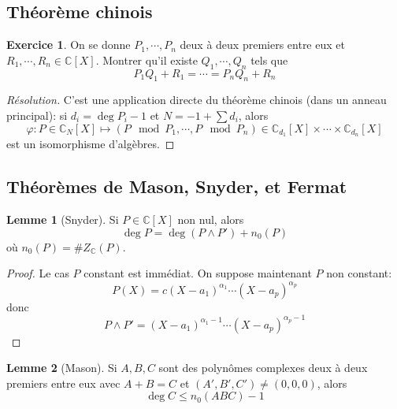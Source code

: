 \documentclass{article}
\theoremstyle{definition}
\newtheorem*{lmm}{Lemme}
\newtheorem*{exo}{Exercice}
\begin{document}
\subsection{Théorème chinois}

\begin{exo}
On se donne $P_1, \cdots, P_n$ deux à deux premiers entre eux et $R_1, \cdots, R_n\in\mathbb C[X]$. Montrer qu'il existe $Q_1, \cdots, Q_n$ tels que \[
    P_1Q_1+R_1=\cdots=P_nQ_n+R_n
\]
\end{exo}

\begin{proof}[Résolution]
    C'est une application directe du théorème chinois (dans un anneau principal): si $d_i=\deg P_i-1$ et $N=-1+\sum d_i$, alors \[
        \varphi: P\in \mathbb C_N[X]\longmapsto (P\mod P_1, \cdots, P\mod P_n)\in\mathbb C_{d_1}[X]\times \cdots \times \mathbb C_{d_n}[X]
    \]
    est un isomorphisme d'algèbres.
\end{proof}

\subsection{Théorèmes de Mason, Snyder, et Fermat}
\begin{lmm}[Snyder]
    Si $P\in\mathbb C[X]$ non nul, alors \[
        \deg P=\deg \left(P\land P'\right)+n_0(P)
    \]
    où $n_0(P)=\#Z_{\mathbb C}(P)$.
\end{lmm}

\begin{proof}
    Le cas $P$ constant est immédiat. On suppose maintenant $P$ non constant: \[
        P(X)=c(X-a_1)^{\alpha_1}\cdots (X-a_p)^{\alpha_p}
    \]
    donc \[
        P\land P'=(X-a_1)^{\alpha_1-1}\cdots (X-a_p)^{\alpha_p-1}
    \]
\end{proof}

\begin{lmm}[Mason]
    Si $A, B, C$ sont des polynômes complexes deux à deux premiers entre eux avec $A+B=C$ et $(A', B', C')\neq (0, 0, 0)$, alors \[
        \deg C\leq n_0(ABC)-1
    \]
\end{lmm}
\end{document}
